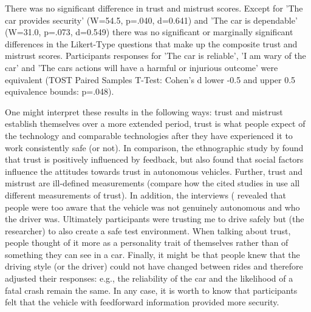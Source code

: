 There was no significant difference in trust and mistrust scores. Except for 'The car provides security' (W=54.5, p=.040, d=0.641) and 'The car is dependable' (W=31.0, p=.073, d=0.549) there was no significant or marginally significant differences in the Likert-Type questions that make up the composite trust and mistrust scores. Participants responses for 'The car is reliable', 'I am wary of the car' and 'The cars actions will have a harmful or injurious outcome' were equivalent (TOST Paired Samples T-Test: Cohen's d lower -0.5 and upper 0.5 equivalence bounds: p=.048).

One might interpret these results in the following ways: trust and mistrust establish themselves over a more extended period, trust is what people expect of the technology and comparable technologies after they have experienced it to work consistently safe (or not). In comparison, the ethnographic study by \cite{Lee2016} found that trust is positively influenced by feedback, but also found that social factors influence the attitudes towards trust in autonomous vehicles. Further, trust and mistrust are ill-defined measurements (compare how the cited studies in \emph{} use all different measurements of trust). In addition, the interviews (\emph{} revealed that people were too aware that the vehicle was not genuinely autonomous and who the driver was. Ultimately participants were trusting me to drive safely but (the researcher) to also create a safe test environment. When talking about trust, people thought of it more as a personality trait of themselves rather than of something they can see in a car. Finally, it might be that people knew that the driving style (or the driver) could not have changed between rides and therefore adjusted their responses: e.g., the reliability of the car and the likelihood of a fatal crash remain the same. In any case, it is worth to know that participants felt that the vehicle with feedforward information provided more security. %

